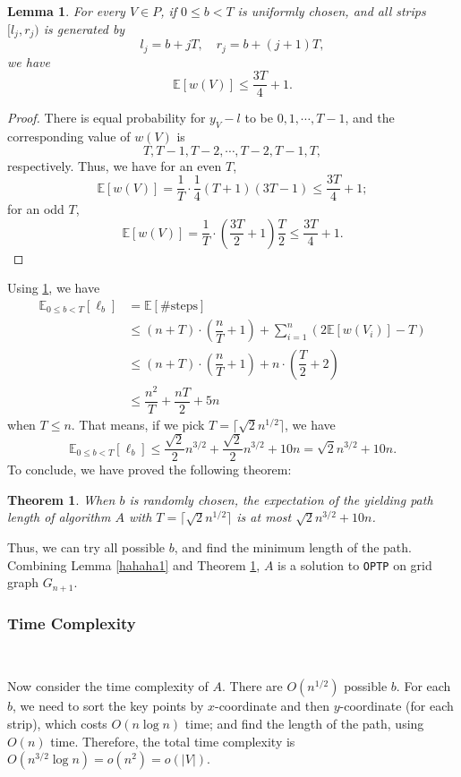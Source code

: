 \documentclass[11pt]{article}
\theoremstyle{plain}
\newtheorem{lemma}{Lemma}[section]
\newtheorem{theorem}{Theorem}[section]
\begin{document}
\begin{lemma}
    \label{lemma5.3}
For every $V\in P$, if $0\le b<T$ is uniformly chosen, and all strips $[l_j,r_j)$ is generated by
$$l_j=b+jT,\quad r_j=b+(j+1)T,$$
we have
$$\mathbb{E}[w(V)]\le \dfrac{3T}{4}+1.$$
\end{lemma}
\begin{proof}
There is equal probability for $y_V-l$ to be $0,1,\cdots,T-1$, and the corresponding value of $w(V)$ is
$$T,T-1,T-2,\cdots,T-2,T-1,T,$$
respectively. Thus, we have for an even $T$,
$$\mathbb{E}[w(V)]=\dfrac{1}{T}\cdot \dfrac{1}{4}(T+1)(3T-1)\le \dfrac{3T}{4}+1;$$
for an odd $T$,
$$\mathbb{E}[w(V)]=\dfrac{1}{T}\cdot (\dfrac{3T}{2}+1)\dfrac{T}{2}\le \dfrac{3T}{4}+1.$$
\end{proof}
Using \ref{lemma5.3}, we have
\begin{align*}
\mathbb{E}_{0\le b<T}[\ell_b] &= \mathbb{E}[\#\text{steps}]\\
&\le (n+T)\cdot \left(\dfrac{n}{T}+1\right)+\sum\limits_{i=1}^n (2\mathbb{E}[w(V_i)]-T)\\
&\le (n+T)\cdot \left(\dfrac{n}{T}+1\right) + n\cdot \left(\dfrac{T}{2}+2\right)\\
&\le \dfrac{n^2}{T}+\dfrac{nT}{2}+5n
\end{align*}
when $T\le n$. That means, if we pick $T=\lceil\sqrt{2}n^{1/2}\rceil$, we have
$$\mathbb{E}_{0\le b<T}[\ell_b]\le \dfrac{\sqrt{2}}{2}n^{3/2}+\dfrac{\sqrt{2}}{2}n^{3/2}+10n = \sqrt{2}n^{3/2}+10n.$$
To conclude, we have proved the following theorem:
\begin{theorem}
    \label{theo5.1}
When $b$ is randomly chosen, the expectation of the yielding path length of algorithm $A$ with $T=\lceil\sqrt{2}n^{1/2}\rceil$ is at most $\sqrt{2}n^{3/2}+10n$.
\end{theorem}

Thus, we can try all possible $b$, and find the minimum length of the path. Combining Lemma \ref{hahaha1} and Theorem \ref{theo5.1}, $A$ is a solution to \texttt{OPTP} on grid graph $G_{n+1}$.

\subsubsection{Time Complexity}\

Now consider the time complexity of $A$. There are $O(n^{1/2})$ possible $b$. For each $b$, we need to sort the key points by $x$-coordinate and then $y$-coordinate (for each strip), which costs $O(n\log n)$ time; and find the length of the path, using $O(n)$ time. Therefore, the total time complexity is $O(n^{3/2}\log n)=o(n^2)=o(|V|)$.
\end{document}
